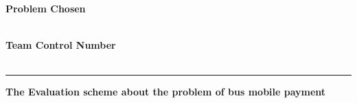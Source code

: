 \documentclass[../mcmpaper]{subfiles}
\begin{document}
	\thispagestyle{empty}
	\begingroup
	\setlength{\parindent}{0pt}
	\begin{minipage}[t]{0.33\linewidth}
		\bfseries\centering%
		Problem Chosen\\[0.7pc]
		{\Huge\textbf{\problem}}\\[2.8pc]
	\end{minipage}%
	\begin{minipage}[t]{0.33\linewidth}
		\centering%
		\textbf{\headset}%
	\end{minipage}%
	\begin{minipage}[t]{0.33\linewidth}
		\centering\bfseries%
		Team Control Number\\[0.7pc]
		{\Huge\textbf{\MCMcontrol}}\\[2.8pc]
	\end{minipage}\par
	\rule{\linewidth}{0.8pt}\par
	\par
	\endgroup
    \begin{center}
    \Large\bfseries The Evaluation scheme about the problem of bus mobile payment
    \end{center}
\end{document}
